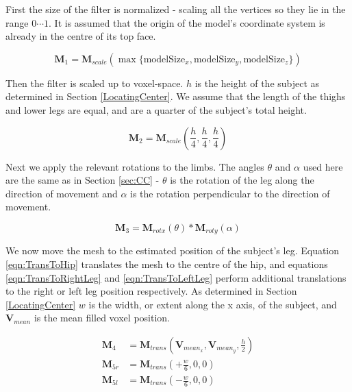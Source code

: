 \bigskip
\noindent First the size of the filter is normalized - scaling all the vertices so they lie in the range ${0 \cdots 1}$.
It is assumed that the origin of the model's coordinate system is already in the centre of its top face.

\begin{equation}
	\mathbf{M}_{1} = \mathbf{M}_{scale}(\max \{\text{modelSize}_{x}, \text{modelSize}_{y}, \text{modelSize}_{z} \})
\end{equation}

Then the filter is scaled up to voxel-space.
$h$ is the height of the subject as determined in Section \ref{LocatingCenter}.
We assume that the length of the thighs and lower legs are equal, and are a quarter of the subject's total height.

\begin{equation}
	\mathbf{M}_{2} = \mathbf{M}_{scale}(\frac{h}{4}, \frac{h}{4}, \frac{h}{4})
\end{equation}

Next we apply the relevant rotations to the limbs.
The angles $\theta$ and $\alpha$ used here are the same as in Section \ref{sec:CC} -
$\theta$ is the rotation of the leg along the direction of movement and $\alpha$ is the rotation perpendicular to the direction of movement.

\begin{equation}
	\mathbf{M}_{3} = \mathbf{M}_{rotx}(\theta) * \mathbf{M}_{roty}(\alpha)
\end{equation}

We now move the mesh to the estimated position of the subject's leg.
Equation \ref{eqn:TransToHip} translates the mesh to the centre of the hip, and equations \ref{eqn:TransToRightLeg} and \ref{eqn:TransToLeftLeg} perform additional
translations to the right or left leg position respectively.
As determined in Section \ref{LocatingCenter} $w$ is the width, or extent along the x axis, of the subject,
and $\mathbf{V}_{mean}$ is the mean filled voxel position.

\begin{align}
	\label{eqn:TransToHip}      \mathbf{M}_{4}  &= \mathbf{M}_{trans}(\mathbf{V}_{mean_{x}}, \mathbf{V}_{mean_{y}}, \frac{h}{2}) \\
	\label{eqn:TransToRightLeg} \mathbf{M}_{5r} &= \mathbf{M}_{trans}(+\frac{w}{6}, 0, 0) \\
	\label{eqn:TransToLeftLeg}  \mathbf{M}_{5l} &= \mathbf{M}_{trans}(-\frac{w}{6}, 0, 0)
\end{align}

